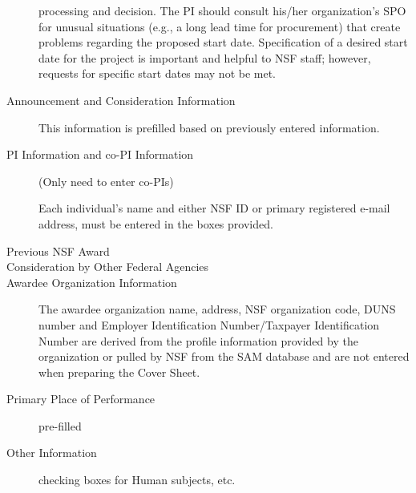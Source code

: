 \begin{description}
\begin{pappg}
            processing and decision. The PI should consult
            his/her organization’s SPO for unusual situations
            (e.g., a long lead time for procurement) that create
            problems regarding the proposed start date.
            Specification of a desired start date for the project
            is important and helpful to NSF staff; however,
            requests for specific start dates may not be met.
        \end{pappg}
    \item[Announcement and Consideration Information]  \quad
        \begin{pappg}
            This information is prefilled based on previously entered
            information.
        \end{pappg}
    \item[PI Information and co-PI Information]  \quad
        \begin{pappg}
            (Only need to enter co-PIs)

            Each individual's name and either NSF ID or primary
            registered e-mail address, must be entered in the
            boxes provided.
        \end{pappg}
    \item[Previous NSF Award]  \quad
    \item[Consideration by Other Federal Agencies]  \quad
    \item[Awardee Organization Information]  \quad
        \begin{pappg}
            The awardee organization name, address, NSF organization
            code, DUNS number and Employer
            Identification Number/Taxpayer Identification Number are
            derived from the profile information provided by
            the organization or pulled by NSF from the SAM database
            and are not entered when preparing the Cover
            Sheet.
        \end{pappg}
    \item[Primary Place of Performance] pre-filled
    \item[Other Information] checking boxes for Human subjects,
        etc.
\end{description}
